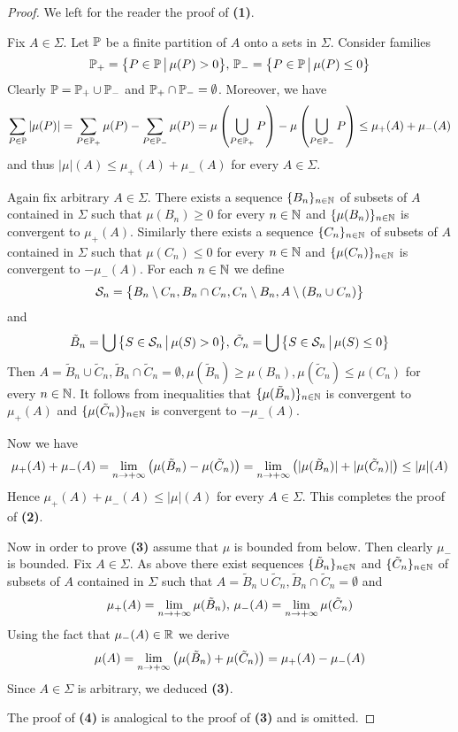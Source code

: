 \begin{proof}
    We left for the reader the proof of \textbf{(1)}.

    Fix $A \in \Sigma$. Let ${\mathbb P}$ be a finite partition of $A$ onto a sets in $\Sigma$. Consider families
    $${\mathbb P}_+ = \big\{P\in {\mathbb P}\,\big|\,\mu(P) > 0\big\},\,{\mathbb P}_- = \big\{P\in {\mathbb P}\,\big|\,\mu(P) \leq 0\big\}$$
    Clearly ${\mathbb P} = {\mathbb P}_+ \cup {\mathbb P}_-$ and ${\mathbb P}_+ \cap {\mathbb P}_- = \emptyset$. Moreover, we have
    $$\sum_{P\in {\mathbb P}}|\mu(P)| = \sum_{P \in {\mathbb P}_+}\mu(P) - \sum_{P \in {\mathbb P}_-}\mu(P) = \mu\left(\bigcup_{P\in {\mathbb P}_+}P\right) - \mu\left(\bigcup_{P\in {\mathbb P}_-}P\right) \leq \mu_+(A) + \mu_-(A)$$
    and thus $|\mu|(A) \leq \mu_+(A) + \mu_-(A)$ for every $A \in \Sigma$.

    Again fix arbitrary $A \in \Sigma$. There exists a sequence $\{B_n\}_{n\in {\mathbb N}}$ of subsets of $A$ contained in $\Sigma$ such that $\mu(B_n) \geq 0$ for every $n\in {\mathbb N}$ and $\{\mu(B_n)\}_{n\in {\mathbb N}}$ is convergent to $\mu_+(A)$. Similarly there exists a sequence $\{C_n\}_{n\in {\mathbb N}}$ of subsets of $A$ contained in $\Sigma$ such that $\mu(C_n) \leq 0$ for every $n \in {\mathbb N}$ and $\{\mu(C_n)\}_{n\in {\mathbb N}}$ is convergent to $-\mu_-(A)$. For each $n\in {\mathbb N}$ we define
    $${\mathcal S}_n = \big\{B_n\setminus C_n,B_n \cap C_n,C_n \setminus B_n, A \setminus (B_n\cup C_n) \big\}$$
    and
    $$\tilde{B}_n = \bigcup\big\{S\in {\mathcal S}_n\,\big|\,\mu(S) > 0\big\},\,\tilde{C}_n = \bigcup\big\{S\in {\mathcal S}_n\,\big|\,\mu(S) \leq 0\big\}$$
    Then $A = \tilde{B}_n\cup \tilde{C}_n,\tilde{B}_n\cap \tilde{C}_n = \emptyset,\mu(\tilde{B}_n) \geq \mu(B_n),\mu(\tilde{C}_n) \leq \mu(C_n)$ for every $n \in {\mathbb N}$. It follows from inequalities that $\{\mu(\tilde{B}_n)\}_{n\in {\mathbb N}}$ is convergent to $\mu_+(A)$ and $\{\mu(\tilde{C}_n)\}_{n\in {\mathbb N}}$ is convergent to $-\mu_-(A)$.

    Now we have
    $$\mu_+(A) + \mu_-(A) = \lim_{n\rightarrow +\infty}\left(\mu(\tilde{B}_n) - \mu(\tilde{C}_n)\right) = \lim_{n\rightarrow +\infty}\left(|\mu(\tilde{B}_n)| + |\mu(\tilde{C}_n)|\right) \leq |\mu|(A)$$
    Hence $\mu_+(A) + \mu_-(A) \leq |\mu|(A)$ for every $A \in \Sigma$. This completes the proof of \textbf{(2)}.

    Now in order to prove \textbf{(3)} assume that $\mu$ is bounded from below. Then clearly $\mu_-$ is bounded. Fix $A \in \Sigma$. As above there exist sequences $\{\tilde{B}_n\}_{n\in {\mathbb N}}$ and $\{\tilde{C}_n\}_{n\in {\mathbb N}}$ of subsets of $A$ contained in $\Sigma$ such that $A = \tilde{B}_n\cup \tilde{C}_n,\tilde{B}_n\cap \tilde{C}_n = \emptyset$ and
    $$\mu_+(A) = \lim_{n\rightarrow +\infty} \mu(\tilde{B}_n),\,\mu_-(A) = \lim_{n\rightarrow +\infty}\mu(\tilde{C}_n)$$
    Using the fact that $\mu_-(A) \in {\mathbb R}$ we derive
    $$\mu(A) = \lim_{n\rightarrow +\infty}\left(\mu(\tilde{B}_n) + \mu(\tilde{C}_n)\right) = \mu_+(A) - \mu_-(A)$$
    Since $A \in \Sigma$ is arbitrary, we deduced \textbf{(3)}.

    The proof of \textbf{(4)} is analogical to the proof of \textbf{(3)} and is omitted.
\end{proof}

